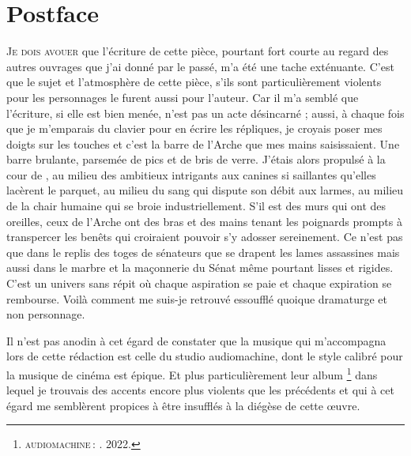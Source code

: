 

\chapter{Postface}

\lettrine[lines=3]{J}{e dois avouer} que l’écriture de cette pièce, pourtant fort courte au regard des autres ouvrages que j’ai donné par le passé, m’a été une tache exténuante. C’est que le sujet et l’atmosphère de cette pièce, s’ils sont particulièrement violents pour les personnages le furent aussi pour l’auteur. Car il m’a semblé que l’écriture, si elle est bien menée, n’est pas un acte désincarné ; aussi, à chaque fois que je m’emparais du clavier pour en écrire les répliques, je croyais poser mes doigts sur les touches et c’est la barre de l’Arche que mes mains saisissaient. Une barre brulante, parsemée de pics et de bris de verre. J’étais alors propulsé à la cour de \campprincipal, au milieu des ambitieux intrigants aux canines si saillantes qu’elles lacèrent le parquet, au milieu du sang qui dispute son débit aux larmes, au milieu de la chair humaine qui se broie industriellement. S’il est des murs qui ont des oreilles, ceux de l’Arche ont des bras et des mains tenant les poignards prompts à transpercer les benêts qui croiraient pouvoir s’y adosser sereinement. Ce n’est pas que dans le replis des toges de sénateurs que se drapent les lames assassines mais aussi dans le marbre et la maçonnerie du Sénat même pourtant lisses et rigides. C’est un univers sans répit où chaque aspiration se paie et chaque expiration se rembourse. Voilà comment me suis-je retrouvé essoufflé quoique dramaturge et non personnage.

Il n’est pas anodin à cet égard de constater que la musique qui m’accompagna lors de cette rédaction est celle du studio audiomachine, dont le style calibré pour la musique de cinéma est épique. Et plus particulièrement leur album \footnote{\textsc{audiomachine} : . 2022.} dans lequel je trouvais des accents encore plus violents que les précédents et qui à cet égard me semblèrent propices à être insufflés à la diégèse de cette œuvre.

